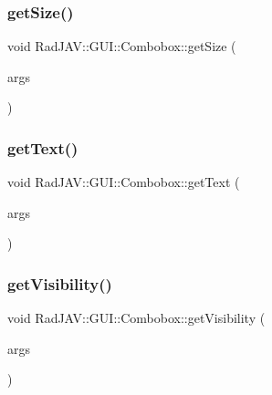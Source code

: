 \subsubsection{\texorpdfstring{get\+Size()}{getSize()}}
{\footnotesize\ttfamily void Rad\+J\+A\+V\+::\+G\+U\+I\+::\+Combobox\+::get\+Size (\begin{DoxyParamCaption}\item[{const v8\+::\+Function\+Callback\+Info$<$ v8\+::\+Value $>$ \&}]{args }\end{DoxyParamCaption})\hspace{0.3cm}{\ttfamily [static]}}

\mbox{\label{class_rad_j_a_v_1_1_g_u_i_1_1_combobox_a1718cbba0b4e2027aad31c623a1f8c3b}} 
\subsubsection{\texorpdfstring{get\+Text()}{getText()}}
{\footnotesize\ttfamily void Rad\+J\+A\+V\+::\+G\+U\+I\+::\+Combobox\+::get\+Text (\begin{DoxyParamCaption}\item[{const v8\+::\+Function\+Callback\+Info$<$ v8\+::\+Value $>$ \&}]{args }\end{DoxyParamCaption})\hspace{0.3cm}{\ttfamily [static]}}

\mbox{\label{class_rad_j_a_v_1_1_g_u_i_1_1_combobox_a419e79debb147bb72f19075566d3c6d3}} 
\subsubsection{\texorpdfstring{get\+Visibility()}{getVisibility()}}
{\footnotesize\ttfamily void Rad\+J\+A\+V\+::\+G\+U\+I\+::\+Combobox\+::get\+Visibility (\begin{DoxyParamCaption}\item[{const v8\+::\+Function\+Callback\+Info$<$ v8\+::\+Value $>$ \&}]{args }\end{DoxyParamCaption})\hspace{0.3cm}{\ttfamily [static]}}

